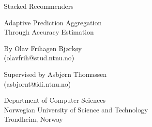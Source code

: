 \null\vspace{4em}
{
\setlength{\parindent}{0em}
\setlength{\parskip}{1em}
\centering

\HUGE
Stacked Recommenders\\
\LARGE
\vspace{1em}

Adaptive Prediction Aggregation\\
Through Accuracy Estimation\\

\vspace{2em}
\HUGE
\aldine
\LARGE
\vspace{1em}
\Large

By Olav Frihagen Bjørkøy\\
(olavfrih@stud.ntnu.no)\\

\vspace{1em}

Supervised by Asbjørn Thomassen\\
(asbjornt@idi.ntnu.no)\\

\vfill

Department of Computer Sciences\\
Norwegian University of Science and Technology\\
Trondheim, Norway\\

}
\cleardoublepage
